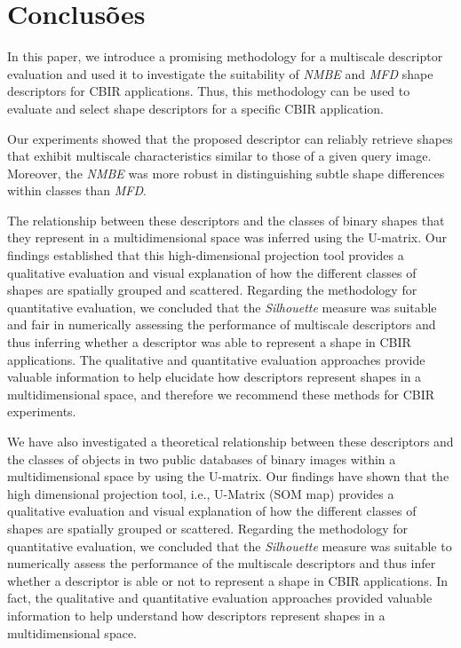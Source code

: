 
\chapter{Conclusões}

In this paper, we introduce a promising methodology for a multiscale descriptor evaluation and used it to investigate the suitability of \emph{NMBE} and \emph{MFD} shape descriptors for CBIR applications. Thus, 
this methodology can be used to evaluate and select shape descriptors for a specific CBIR application.

Our experiments showed that the proposed descriptor can reliably retrieve shapes that exhibit multiscale characteristics similar to those of a given query image. Moreover, the \emph{NMBE} was more robust in distinguishing subtle shape differences within classes than \emph{MFD}.

The relationship between these descriptors and the classes of binary shapes that they represent in a multidimensional space was inferred using the U-matrix. Our findings established that this high-dimensional projection tool provides a qualitative evaluation and visual explanation of how the different classes of shapes are spatially grouped and scattered. Regarding the methodology for quantitative evaluation,  we concluded that the \emph{Silhouette} measure was suitable and fair in numerically assessing the performance of multiscale descriptors and thus inferring  whether a descriptor was able to represent a shape in CBIR applications. 
The qualitative and quantitative evaluation approaches provide valuable information to help elucidate how descriptors represent shapes in a multidimensional space, and therefore we recommend these methods for CBIR experiments.


We have also investigated  a theoretical relationship between these descriptors and the classes of objects in two public databases of binary images within a multidimensional space by using the U-matrix. Our findings have shown that the high dimensional projection tool, i.e., U-Matrix (SOM map) provides a qualitative evaluation and visual explanation of how the different classes of shapes are spatially grouped or scattered. Regarding the methodology for quantitative evaluation,  we concluded that the \emph{Silhouette} measure was suitable to numerically assess the performance of the multiscale descriptors and thus infer  whether a descriptor is able or not to represent a shape in CBIR applications. 
In fact, the qualitative and quantitative evaluation approaches provided valuable information to help understand how descriptors represent shapes in a multidimensional space.


